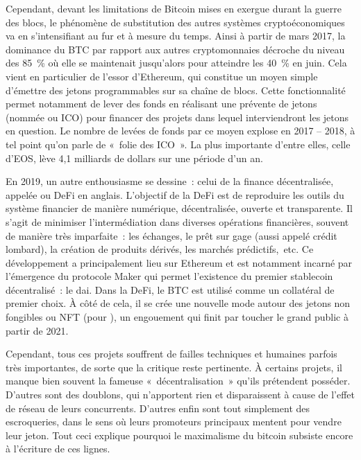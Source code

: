 
Cependant, devant les limitations de Bitcoin mises en exergue durant la guerre des blocs, le phénomène de substitution des autres systèmes cryptoéconomiques va en s'intensifiant au fur et à mesure du temps. Ainsi à partir de mars 2017, la dominance du BTC par rapport aux autres cryptomonnaies décroche du niveau des 85~\% où elle se maintenait jusqu'alors pour atteindre les 40~\% en juin. Cela vient en particulier de l'essor d'Ethereum, qui constitue un moyen simple d'émettre des jetons programmables sur sa chaîne de blocs. Cette fonctionnalité permet notamment de lever des fonds en réalisant une prévente de jetons (nommée  ou ICO) pour financer des projets dans lequel interviendront les jetons en question. Le nombre de levées de fonds par ce moyen explose en 2017 -- 2018, à tel point qu'on parle de «~folie des ICO~». La plus importante d'entre elles, celle d'EOS, lève 4,1 milliards de dollars sur une période d'un an.


En 2019, un autre enthousiasme se dessine~: celui de la finance décentralisée, appelée  ou DeFi en anglais. L'objectif de la DeFi est de reproduire les outils du système financier de manière numérique, décentralisée, ouverte et transparente. Il s'agit de minimiser l'intermédiation dans diverses opérations financières, souvent de manière très imparfaite~: les échanges, le prêt sur gage (aussi appelé crédit lombard), la création de produits dérivés, les marchés prédictifs,~etc. Ce développement a principalement lieu sur Ethereum et est notamment incarné par l'émergence du protocole Maker qui permet l'existence du premier stablecoin décentralisé~: le dai. Dans la DeFi, le BTC est utilisé comme un collatéral de premier choix. À côté de cela, il se crée une nouvelle mode autour des jetons non fongibles ou NFT (pour ), un engouement qui finit par toucher le grand public à partir de 2021.

Cependant, tous ces projets souffrent de failles techniques et humaines parfois très importantes, de sorte que la critique reste pertinente. À certains projets, il manque bien souvent la fameuse «~décentralisation~» qu'ils prétendent posséder. D'autres sont des doublons, qui n'apportent rien et disparaissent à cause de l'effet de réseau de leurs concurrents. D'autres enfin sont tout simplement des escroqueries, dans le sens où leurs promoteurs principaux mentent pour vendre leur jeton. Tout ceci explique pourquoi le maximalisme du bitcoin subsiste encore à l'écriture de ces lignes.


